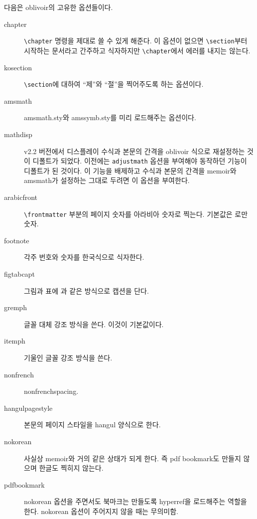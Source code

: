 \documentclass[
	12pt,
	a4paper,
	kosection,
	footnote,
	microtype,
	figtabcapt,
]{oblivoir}
\newcommand\obclass{ob\-liv\-oir\oblivoirallowbreak}
\begin{document}
다음은 \obclass 의 고유한 옵션들이다. 
\begin{description}
\item [chapter] \verb|\chapter| 명령을 제대로 쓸 수 있게 해준다. 이 옵션이 없으면  \verb|\section|부터 시작하는 문서라고 간주하고 식자하지만 \verb|\chapter|에서 에러를 내지는 않는다.
\item [kosection] \verb|\section|에 대하여 ``제''와 ``절''을 찍어주도록 하는 옵션이다.
\item [amsmath] amsmath.sty와 amssymb.sty를 미리 로드해주는 옵션이다.
\item [mathdisp] v2.2 버전에서 디스플레이 수식과 본문의 간격을 oblivoir 식으로 재설정하는 것이 디폴트가 되었다. 이전에는 \verb|adjustmath| 옵션을 부여해야 동작하던 기능이 디폴트가 된 것이다. 이 기능을 배제하고 수식과 본문의 간격을 memoir와 amsmath가 설정하는 그대로 두려면 이 옵션을 부여한다.
\item [arabicfront] \verb|\frontmatter| 부분의 페이지 숫자를 아라비아 숫자로 찍는다. 기본값은 로만 숫자.
\item [footnote] 각주 번호와 숫자를 한국식으로 식자한다.
\item [figtabcapt] 그림과 표에 과 같은 방식으로 캡션을 단다.
\item [gremph] 글꼴 대체 강조 방식을 쓴다. 이것이 기본값이다.
\item [itemph] 기울인 글꼴 강조 방식을 쓴다.
\item [nonfrench] nonfrenchspacing.
\item [hangulpagestyle] 본문의 페이지 스타일을 hangul 양식으로 한다.
\item [nokorean] 사실상 memoir와 거의 같은 상태가 되게 한다. 즉 pdf bookmark도 만들지 않으며 한글도 찍히지 않는다.
\item [pdfbookmark] nokorean 옵션을 주면서도 북마크는 만들도록 hyperref을 로드해주는 역할을 한다. nokorean 옵션이 주어지지 않을 때는 무의미함.

\end{description}
\end{document}
